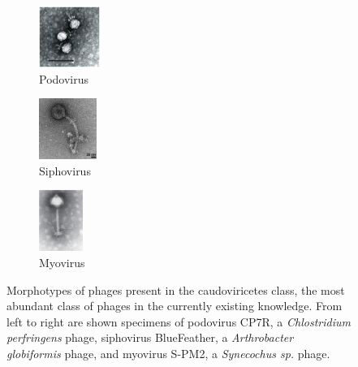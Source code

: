 \documentclass[runningheads]{llncs}
\begin{document}
\begin{figure}
    \begin{center}
        
    
    \begin{subfigure}[b]{0.2\textwidth}
        \begin{center}
        \includegraphics[height = 75px]{./figures/fig-3-1-podovirus.jpg}
        \caption{Podovirus}
        \end{center}
    \end{subfigure}
    \begin{subfigure}[b]{0.2\textwidth}
    \begin{center}
        
    
        \includegraphics[height = 75px]{./figures/fig-3-2-siphovirus.jpeg}
        \caption{Siphovirus}
        \end{center}
    \end{subfigure}
    \begin{subfigure}[b]{0.2\textwidth}
    \begin{center}
        \includegraphics[height = 75px]{./figures/fig-3-3-myovirus.png}
        \caption{Myovirus}
        \end{center}
    \end{subfigure}
    \caption{Morphotypes of phages present in the caudoviricetes class, the most abundant class of phages in the currently existing knowledge. From left to right are shown specimens of podovirus CP7R, a \textit{Chlostridium perfringens} phage, siphovirus BlueFeather, a \textit{Arthrobacter globiformis} phage, and myovirus S-PM2, a \textit{Synecochus sp.} phage. \cite{volozhantsev2012,demo2021,mann2005}}
    \label{fig3}
    \end{center}
\end{figure}
\end{document}
